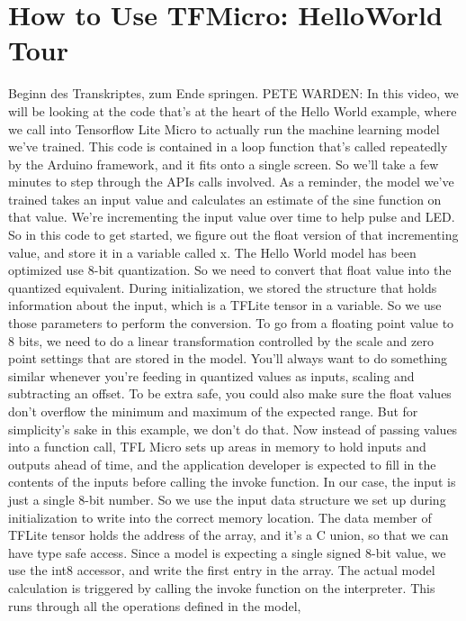 \section{How to Use TFMicro: HelloWorld Tour}

Beginn des Transkriptes, zum Ende springen.
PETE WARDEN: In this video, we will be looking
at the code that's at the heart of the Hello World example,
where we call into Tensorflow Lite Micro to actually run the machine learning
model we've trained.
This code is contained in a loop function that's
called repeatedly by the Arduino framework,
and it fits onto a single screen.
So we'll take a few minutes to step through the APIs calls involved.
As a reminder, the model we've trained takes an input value
and calculates an estimate of the sine function on that value.
We're incrementing the input value over time to help pulse and LED.
So in this code to get started, we figure out
the float version of that incrementing value,
and store it in a variable called x.
The Hello World model has been optimized use 8-bit quantization.
So we need to convert that float value into the quantized equivalent.
During initialization, we stored the structure
that holds information about the input, which is a TFLite tensor in a variable.
So we use those parameters to perform the conversion.
To go from a floating point value to 8 bits,
we need to do a linear transformation controlled by the scale and zero point
settings that are stored in the model.
You'll always want to do something similar
whenever you're feeding in quantized values as inputs, scaling
and subtracting an offset.
To be extra safe, you could also make sure the float
values don't overflow the minimum and maximum of the expected range.
But for simplicity's sake in this example, we don't do that.
Now instead of passing values into a function call,
TFL Micro sets up areas in memory to hold inputs and outputs ahead of time,
and the application developer is expected
to fill in the contents of the inputs before calling the invoke function.
In our case, the input is just a single 8-bit number.
So we use the input data structure we set up during initialization to write
into the correct memory location.
The data member of TFLite tensor holds the address of the array,
and it's a C union, so that we can have type safe access.
Since a model is expecting a single signed 8-bit value,
we use the int8 accessor, and write the first entry in the array.
The actual model calculation is triggered
by calling the invoke function on the interpreter.
This runs through all the operations defined in the model,
